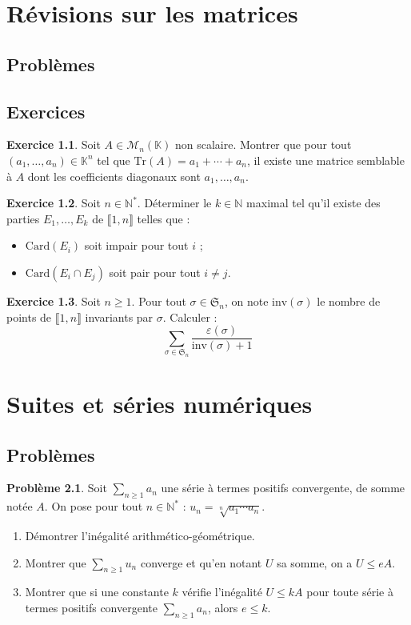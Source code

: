 \documentclass[french]{book}
\newcommand{\N}{\mathbb{N}}
\newcommand{\K}{\mathbb{K}}
\newcommand{\st}{^*}
\newcommand{\card}{\text{Card}}
\newcommand{\Tr}{\text{Tr}}
\theoremstyle{definition}
\newtheorem{ex}{Exercice}[chapter]
\newtheorem{pro}{Problème}[chapter]
\begin{document}
\chapter{Révisions sur les matrices}

\section{Problèmes}

\section{Exercices}

\begin{ex}
	Soit $A\in\mathcal{M}_n(\K)$ non scalaire. Montrer que pour tout $(a_1,\ldots,a_n)\in\K^n$ tel que $\Tr(A)=a_1+\cdots+a_n$, il existe une matrice semblable à $A$ dont les coefficients diagonaux sont $a_1,\ldots,a_n$.
\end{ex}

\begin{ex}
	Soit $n\in\N\st$. Déterminer le $k\in\N$ maximal tel qu'il existe des parties $E_1,\ldots,E_k$ de $\llbracket 1,n\rrbracket$ telles que :
	\begin{itemize}
		\item $\card(E_i)$ soit impair pour tout $i$ ;
		\item $\card(E_i\cap E_j)$ soit pair pour tout $i\ne j$.
	\end{itemize}
\end{ex}

\begin{ex}
	Soit $n\geqslant1$. Pour tout $\sigma\in\mathfrak{S}_n$, on note $\text{inv}(\sigma)$ le nombre de points de $\llbracket1,n\rrbracket$ invariants par $\sigma$. Calculer : $$\sum_{\sigma\in\mathfrak{S}_n}\frac{\varepsilon(\sigma)}{\text{inv}(\sigma)+1}$$
\end{ex}

\chapter{Suites et séries numériques}

\section{Problèmes}

\begin{pro}
	Soit $\displaystyle\sum_{n\geqslant 1}a_n$ une série à termes positifs convergente, de somme notée $A$. On pose pour tout $n\in\N\st$ : $u_n=\sqrt[n]{a_1\cdots a_n}$.
	\begin{enumerate}
		\item Démontrer l'inégalité arithmético-géométrique.
		\item Montrer que $\displaystyle\sum_{n\geqslant 1}u_n$ converge et qu'en notant $U$ sa somme, on a $U\leqslant e A$.
		\item Montrer que si une constante $k$ vérifie l'inégalité $U\leqslant k A$ pour toute série à termes positifs convergente $\displaystyle\sum_{n\geqslant 1}a_n$, alors $e\leqslant k$.
	\end{enumerate}
\end{pro}
\end{document}
